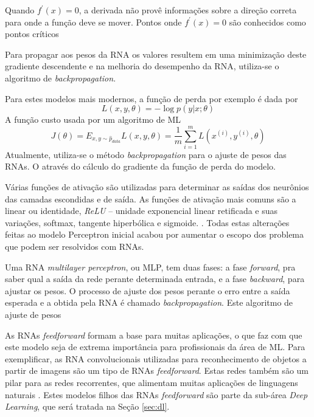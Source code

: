 Quando $f^\prime(x) =0 $, a derivada não provê informações sobre a direção correta para onde a função deve se mover. Pontos onde $f^\prime(x) =0 $ são conhecidos como pontos críticos

\cite{goodfellow2016deep}

Para propagar aos pesos da RNA os valores resultem em uma minimização deste gradiente descendente e na melhoria do desempenho da RNA, utiliza-se o algoritmo de \emph{backpropagation}.

Para estes modelos mais modernos, a função de perda por exemplo é dada por
\begin{equation}
	L(x, y, \theta) = - \log p (y|x;\theta)
\end{equation}
A função custo usada por um algoritmo de ML
\begin{equation}
	J(\theta) = E_{x,y \sim \hat{p}_{data}} L(x, y, \theta) = \frac{1}{m} \sum_{i=1}^{m} L(x^{(i)}, y^{(i)}, \theta)
\end{equation}
Atualmente, utiliza-se o método \emph{backpropagation} para o ajuste de pesos das RNAs. O através do cálculo do gradiente da função de perda do modelo.

Várias funções de ativação são utilizadas para determinar as saídas dos neurônios das camadas escondidas e de saída. As funções de ativação mais comuns são a linear ou identidade, \emph{ReLU} -- unidade exponencial linear retificada e suas variações, softmax, tangente hiperbólica e sigmoide.
. Todas estas alterações feitas ao modelo Perceptron inicial acabou por aumentar o escopo dos problema que podem ser resolvidos com RNAs.

Uma RNA \emph{multilayer perceptron}, ou MLP, tem duas fases: a fase \emph{forward}, pra saber qual a saída da rede perante determinada entrada, e a fase \emph{backward}, para ajustar os pesos. O processo de ajuste dos pesos perante o erro entre a saída esperada e a obtida pela RNA é chamado \emph{backpropagation}. Este algoritmo de ajuste de pesos


As RNAs \emph{feedforward} formam a base para muitas aplicações, o que faz com que este modelo seja de extrema importância para profissionais da área de ML. Para exemplificar, as RNA convolucionais utilizadas para reconhecimento de objetos a partir de imagens são um tipo de RNAs \emph{feedforward}. Estas redes também são um pilar para as redes recorrentes, que alimentam muitas aplicações de linguagens naturais \cite{goodfellow2016deep}. Estes modelos filhos das RNAs \emph{feedforward} são parte da sub-área \emph{Deep Learning}, que será tratada na Seção \ref{sec:dl}.
